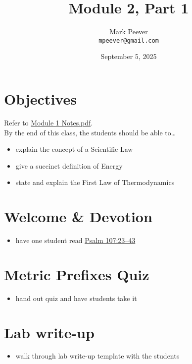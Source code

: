 \documentclass[10pt, oneside]{article}   	%
\title{Module 2, Part 1}
\author{Mark Peever\\ \texttt{mpeever@gmail.com}}
\date{September 5, 2025}
\begin{document}
\maketitle

\section*{Objectives}
Refer to \href{https://drive.google.com/file/d/1p-i3eBQ1MXrmtNDu9kW5U6uMlN-BSEsR/view?usp=sharing}{Module 1 Notes.pdf}.\\

By the end of this class, the students should be able to\ldots
\begin{itemize}
\item explain the concept of a Scientific Law
\item give a succinct definition of Energy
\item state and explain the First Law of Thermodynamics
\end{itemize}

\section*{Welcome \& Devotion}
\begin{itemize}
\item have one student read \href{https://www.biblegateway.com/passage/?search=Psalm\%20107\&version=LSB}{Psalm 107:23--43}
\end{itemize}

\section*{Metric Prefixes Quiz}
\begin{itemize}
\item hand out quiz and have students take it 
\end{itemize}

\section*{Lab write-up}
\begin{itemize}
\item walk through lab write-up template with the students
\end{itemize}
\end{document}
